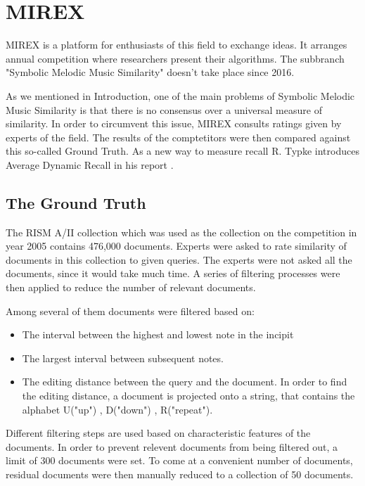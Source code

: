 \documentclass{llncs}
\begin{document}
		
	\section{MIREX}
		MIREX is a platform for enthusiasts of this field to exchange ideas. It arranges annual competition where researchers present their algorithms. The subbranch "Symbolic Melodic Music Similarity" doesn't take place since 2016. 


		As we mentioned in Introduction, one of the main problems of Symbolic Melodic Music Similarity is that there is no consensus over a universal measure of similarity. In order to circumvent this issue, MIREX consults ratings given by experts of the field. The results of the comptetitors were then compared against this so-called Ground Truth. As a new way to measure recall R. Typke introduces Average Dynamic Recall in his report \cite{three}.       


		\subsection{The Ground Truth}
 		The RISM A/II collection which was used as the collection on the competition in year 2005 contains 476,000 documents. Experts were asked to rate similarity of documents in this collection to given queries. The experts were not asked all the documents, since it would take much time. A series of filtering processes were then applied to reduce the number of relevant documents. 

 		Among several of them documents were filtered based on: 

 		\begin{itemize}
 			\item The interval between the highest and lowest note in the incipit
 			\item The largest interval between subsequent notes.
 			\item The editing distance between the query and the document. In order to find the editing distance, a document is projected onto a string, that contains the alphabet U("up") , D("down") , R("repeat"). 
 		\end{itemize} 

 		Different filtering steps are used based on characteristic features of the documents. In order to prevent relevent documents from being filtered out, a limit of 300 documents were set. To come at a convenient number of documents, residual documents were then manually reduced to a collection of 50 documents.
\end{document}
